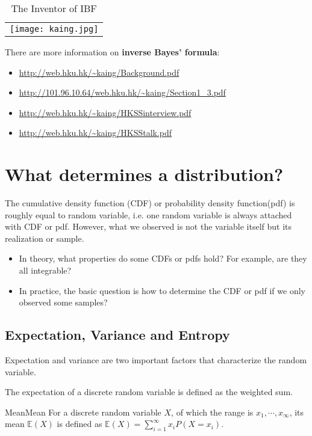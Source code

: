 \documentclass[titlestyle=hang,11pt]{elegantbook}
\begin{document}
\begin{table}[h]
	\centering
	\caption{The Inventor of IBF}
	\begin{tabular}{|c|}
		\hline
		\texttt{[image: kaing.jpg]} \\
	\end{tabular}
\end{table}

There are more information on \textbf{inverse Bayes' formula}:
\begin{itemize}
		\item \url{http://web.hku.hk/~kaing/Background.pdf}
		\item \url{http://101.96.10.64/web.hku.hk/~kaing/Section1_3.pdf}
        \item \url{http://web.hku.hk/~kaing/HKSSinterview.pdf}
		\item \url{http://web.hku.hk/~kaing/HKSStalk.pdf}
\end{itemize}


\section{What determines a distribution?}

The cumulative density function (CDF) or probability density function(pdf) is roughly equal to random variable, i.e. one random variable is always attached with CDF or pdf. However, what we observed is not the variable itself but its realization or sample.
\begin{itemize}
  \item In theory, what properties do some CDFs or pdfs hold? For example, are they all integrable?
  \item In practice, the basic question is how to determine the CDF or pdf if we only observed some samples?
\end{itemize}

\subsection{Expectation, Variance and Entropy}

Expectation and variance are two important factors that characterize the random variable.

The expectation of a discrete random variable is defined as the weighted sum.
\begin{definition}{Mean}{Mean}
For a discrete random variable $X$, of which the range is ${x_1,\cdots, x_{\infty}}$, its mean $\mathbb{E}(X)$ is defined as  $\mathbb{E}(X)=\sum_{i=1}^{\infty}x_i P(X=x_i)$.
\end{definition}
\end{document}
